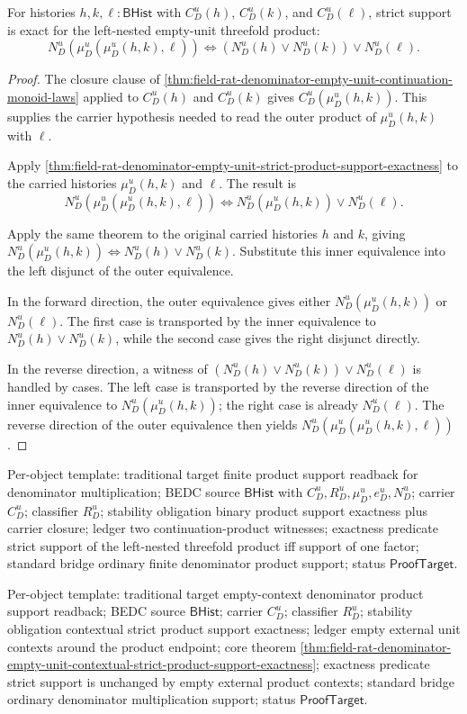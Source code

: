 \begin{theorem}
\label{thm:field-rat-denominator-empty-unit-threefold-strict-support-exactness}
For histories $h,k,\ell:\mathsf{BHist}$ with $C_D^u(h)$, $C_D^u(k)$, and
$C_D^u(\ell)$, strict support is exact for the left-nested empty-unit
threefold product:
$$
N_D^u(\mu_D^u(\mu_D^u(h,k),\ell))
\Longleftrightarrow
(N_D^u(h)\lor N_D^u(k))\lor N_D^u(\ell).
$$
\end{theorem}
\begin{proof}
The closure clause of
\autoref{thm:field-rat-denominator-empty-unit-continuation-monoid-laws}
applied to $C_D^u(h)$ and $C_D^u(k)$ gives
$C_D^u(\mu_D^u(h,k))$. This supplies the carrier hypothesis needed to read the
outer product of $\mu_D^u(h,k)$ with $\ell$.

Apply
\autoref{thm:field-rat-denominator-empty-unit-strict-product-support-exactness}
to the carried histories $\mu_D^u(h,k)$ and $\ell$. The result is
$$
N_D^u(\mu_D^u(\mu_D^u(h,k),\ell))
\Longleftrightarrow
N_D^u(\mu_D^u(h,k))\lor N_D^u(\ell).
$$

Apply the same theorem to the original carried histories $h$ and $k$, giving
$N_D^u(\mu_D^u(h,k))\Longleftrightarrow N_D^u(h)\lor N_D^u(k)$. Substitute this
inner equivalence into the left disjunct of the outer equivalence.

In the forward direction, the outer equivalence gives either
$N_D^u(\mu_D^u(h,k))$ or $N_D^u(\ell)$. The first case is transported by the
inner equivalence to $N_D^u(h)\lor N_D^u(k)$, while the second case gives the
right disjunct directly.

In the reverse direction, a witness of
$(N_D^u(h)\lor N_D^u(k))\lor N_D^u(\ell)$ is handled by cases. The left case
is transported by the reverse direction of the inner equivalence to
$N_D^u(\mu_D^u(h,k))$; the right case is already $N_D^u(\ell)$. The reverse
direction of the outer equivalence then yields
$N_D^u(\mu_D^u(\mu_D^u(h,k),\ell))$.
\end{proof}

Per-object template: traditional target finite product support readback for
denominator multiplication; BEDC source $\mathsf{BHist}$ with $C_D^u,R_D^u,
\mu_D^u,e_D^u,N_D^u$; carrier $C_D^u$; classifier $R_D^u$; stability
obligation binary product support exactness plus carrier closure; ledger two
continuation-product witnesses; exactness predicate strict support of the
left-nested threefold product iff support of one factor; standard bridge
ordinary finite denominator product support; status $\mathsf{ProofTarget}$.

Per-object template: traditional target empty-context denominator product
support readback; BEDC source $\mathsf{BHist}$; carrier $C_D^u$; classifier
$R_D^u$; stability obligation contextual strict product support exactness;
ledger empty external unit contexts around the product endpoint; core theorem
\autoref{thm:field-rat-denominator-empty-unit-contextual-strict-product-support-exactness};
exactness predicate strict support is unchanged by empty external product
contexts; standard bridge ordinary denominator multiplication support; status
$\mathsf{ProofTarget}$.
